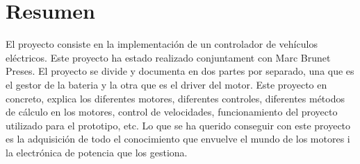 \chapter{Resumen}
\label{chap:Resumen}

El proyecto consiste en la implementación de un controlador de vehículos eléctricos. Este proyecto ha estado realizado conjuntament con Marc Brunet Preses. El proyecto se divide y documenta en dos partes por separado, una que es el gestor de la bateria y la otra que es el driver del motor. Este proyecto en concreto, explica los diferentes motores, diferentes controles, diferentes métodos de cálculo en los motores, control de velocidades, funcionamiento del proyecto utilizado para el prototipo, etc. Lo que se ha querido conseguir con este proyecto es la adquisición de todo el conocimiento que envuelve el mundo de los motores i la electrónica de potencia que los gestiona.










